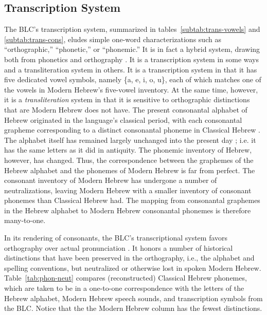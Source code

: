 \subsection{Transcription System}
\label{sec:transcription}
The \ac{BLC}'s transcription system, summarized in tables~\ref{subtab:trans-vowels} and \ref{subtab:trans-cons}, eludes simple one-word 
characterizations such as ``orthographic,''
``phonetic,'' or ``phonemic.'' It is in fact a hybrid system, drawing
both from phonetics and orthography \citep{albert-et-al:2013}. 
It is a transcription system in some ways and a transliteration 
system in others. It is a transcription system in that it has 
five dedicated vowel symbols, 
namely \{a, e, i, o, u\}, each of which matches one of the 
vowels in Modern Hebrew's five-vowel inventory. 
At the same time, however, 
it is a \emph{transliteration} system in that it is sensitive to 
orthographic distinctions that are Modern Hebrew does not have.
The present consonantal alphabet of Hebrew originated in the 
language's classical period, with each 
consonantal grapheme corresponding to 
a distinct consonantal phoneme in Classical Hebrew \citep{rendsburg:1997}. The alphabet itself
has remained largely unchanged 
into the present day \citep{weinberg:1975, ravid:2005}; i.e. it has the same letters as it 
did in antiquity. The phonemic inventory 
of Hebrew, however, has changed. Thus, the correspondence 
between the graphemes of the Hebrew
alphabet and the phonemes of Modern Hebrew is far from perfect. 
The consonant inventory of Modern Hebrew
has undergone a number of neutralizations, leaving 
Modern Hebrew with a smaller inventory of consonant phonemes than
Classical Hebrew had. %
The mapping 
from consonantal graphemes in the Hebrew alphabet
to Modern Hebrew consonantal phonemes is therefore many-to-one.

In its rendering of consonants, the \ac{BLC}'s transcriptional system 
favors orthography over actual pronunciation \citep{albert-et-al:2013}.
It honors a number of historical distinctions that have been preserved in the orthography, 
i.e., the alphabet and 
spelling conventions, but neutralized or otherwise lost in spoken Modern Hebrew. 
Table~\ref{tab:phon-neut} compares 
(reconstructed) Classical Hebrew phonemes, which are taken to be in a one-to-one 
correspondence with the letters of 
the Hebrew alphabet, Modern Hebrew speech sounds, and transcription symbols 
from the \ac{BLC}. Notice that the
the Modern Hebrew column has the fewest distinctions.

